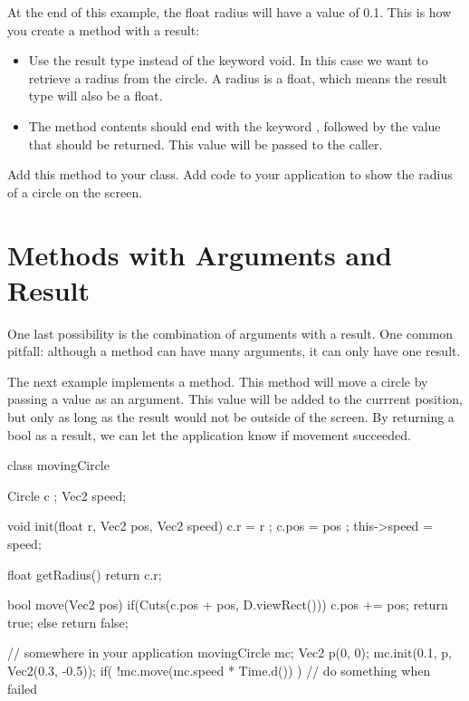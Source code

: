 At the end of this example, the float radius will have a value of 0.1. This is how you create a method with a result:

\begin{itemize}
\item Use the result type instead of the keyword void. In this case we want to retrieve a radius from the circle. A radius is a float, which means the result type will also be a float.
\item The method contents should end with the keyword , followed by the value that should be returned. This value will be passed to the caller.
\end{itemize}

\begin{exercise}
Add this method to your class. Add code to your application to show the radius of a circle on the screen.
\end{exercise}

\section{Methods with Arguments and Result}
One last possibility is the combination of arguments with a result. One common pitfall: although a method can have many arguments, it can only have one result.

The next example implements a  method. This method will move a circle by passing a value as an argument. This value will be added to the currrent position, but only as long as the result would not be outside of the screen. By returning a bool as a result, we can let the application know if movement succeeded.

\begin{code}
class movingCircle {
  Circle c    ;
  Vec2   speed;
  
  void init(float r, Vec2 pos, Vec2 speed) {
    c.r         = r    ;
    c.pos       = pos  ;
    this->speed = speed;
  }
  
  float getRadius() {
    return c.r;
  }
  
  bool move(Vec2 pos) {
    if(Cuts(c.pos + pos, D.viewRect())) {
      c.pos += pos;
      return true;
    } else {
      return false;
    }
  }
}

// somewhere in your application
movingCircle mc;
Vec2 p(0, 0);
mc.init(0.1, p, Vec2(0.3, -0.5));
if( !mc.move(mc.speed * Time.d()) ) {
  // do something when failed
}
\end{code}

